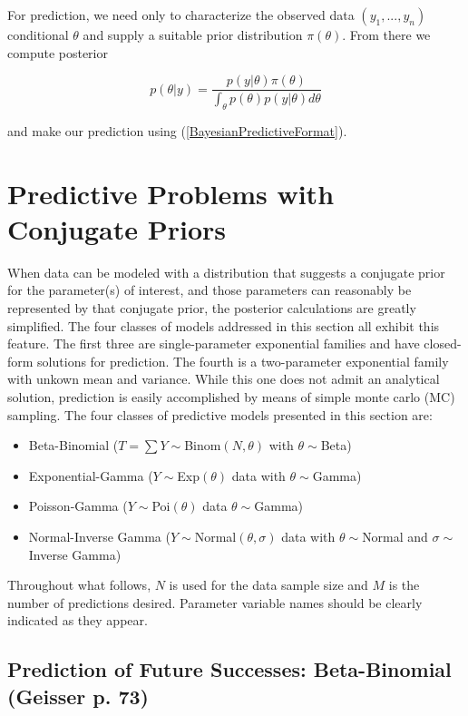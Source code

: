 \documentclass[12pt, a4paper]{article}
\begin{document}
For prediction, we need only to characterize the observed data $(y_1,...,y_n)$ conditional $\theta$ and supply a suitable prior distribution $\pi(\theta)$.  From there we compute posterior

$$p(\theta|y) = \frac{p(y|\theta)\pi(\theta)}{\int_\theta p(\theta)p(y|\theta)d\theta}$$

and make our prediction using (\ref{BayesianPredictiveFormat}).

\clearpage

\section{Predictive Problems with Conjugate Priors}

When data can be modeled with a distribution that suggests a conjugate prior for the parameter(s) of interest, and those parameters can reasonably be represented by that conjugate prior, the posterior calculations are greatly simplified.  The four classes of models addressed in this section all exhibit this feature.  The first three are single-parameter exponential families and have closed-form solutions for prediction.  The fourth is a two-parameter exponential family with unkown mean and variance.  While this one does not admit an analytical solution, prediction is easily accomplished by means of simple monte carlo (MC) sampling.  The four classes of predictive models presented in this section are:
\begin{itemize}
  \item Beta-Binomial ($T = \sum Y\sim$Binom$(N,\theta)$ with $\theta\sim$Beta)
  \item Exponential-Gamma ($Y\sim$Exp$(\theta)$ data with $\theta\sim$Gamma)
  \item Poisson-Gamma ($Y\sim$Poi$(\theta)$ data $\theta\sim$Gamma)
  \item Normal-Inverse Gamma ($Y\sim$Normal$(\theta,\sigma)$ data with $\theta\sim$Normal and $\sigma\sim$Inverse Gamma)
\end{itemize}

Throughout what follows, $N$ is used for the data sample size and $M$ is the number of predictions desired.  Parameter variable names should be clearly indicated as they appear.

  \subsection{Prediction of Future Successes:  Beta-Binomial (Geisser p. 73)}
\end{document}
